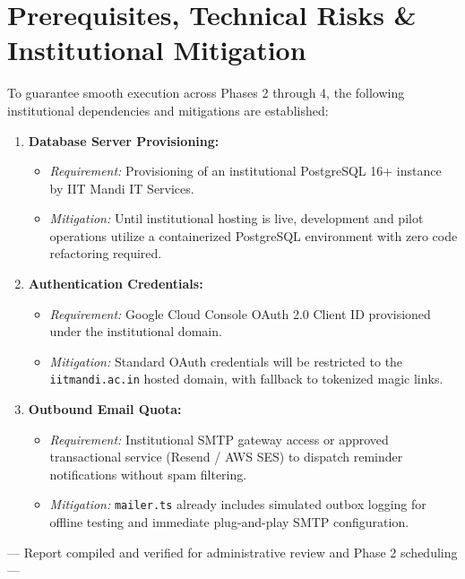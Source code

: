 \documentclass[11pt,a4paper]{article}
\begin{document}
\vspace{-0.2cm}

\section{Prerequisites, Technical Risks \& Institutional Mitigation}

To guarantee smooth execution across Phases 2 through 4, the following institutional dependencies and mitigations are established:

\begin{enumerate}[leftmargin=1.4em, itemsep=2.5pt]
\item \textbf{Database Server Provisioning:}
  \begin{itemize}[leftmargin=1.2em, itemsep=1pt]
  \item \textit{Requirement:} Provisioning of an institutional PostgreSQL 16+ instance by IIT Mandi IT Services.
  \item \textit{Mitigation:} Until institutional hosting is live, development and pilot operations utilize a containerized PostgreSQL environment with zero code refactoring required.
  \end{itemize}
\item \textbf{Authentication Credentials:}
  \begin{itemize}[leftmargin=1.2em, itemsep=1pt]
  \item \textit{Requirement:} Google Cloud Console OAuth 2.0 Client ID provisioned under the institutional domain.
  \item \textit{Mitigation:} Standard OAuth credentials will be restricted to the \texttt{iitmandi.ac.in} hosted domain, with fallback to tokenized magic links.
  \end{itemize}
\item \textbf{Outbound Email Quota:}
  \begin{itemize}[leftmargin=1.2em, itemsep=1pt]
  \item \textit{Requirement:} Institutional SMTP gateway access or approved transactional service (Resend / AWS SES) to dispatch reminder notifications without spam filtering.
  \item \textit{Mitigation:} \texttt{mailer.ts} already includes simulated outbox logging for offline testing and immediate plug-and-play SMTP configuration.
  \end{itemize}
\end{enumerate}

\vspace{0.4cm}

\begin{center}
\small\color{gray}
--- Report compiled and verified for administrative review and Phase 2 scheduling ---
\end{center}
\end{document}
